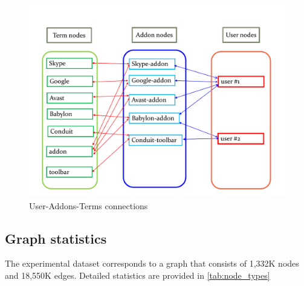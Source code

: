 \documentclass[ijoc,nonblindrev]{informs3} %
\numberwithin{equation}{subsection}
\begin{document}
\begin{figure}[!htbp]
\centering
\begin{small}
\includegraphics[width=\textwidth]{figures/symbolic_graph.pdf}
\end{small}
\caption{User-Addons-Terms connections}
\label{fig:symbolic_graph}
\end{figure}

\subsection{Graph statistics}

The experimental dataset corresponds to a graph that consists of 1,332K nodes and 18,550K edges. Detailed statistics are provided in \autoref{tab:node_types}
\end{document}
